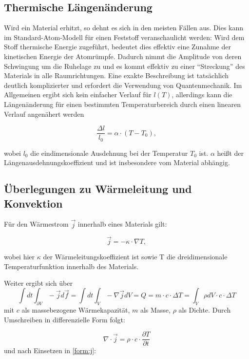 \subsection{Thermische Längenänderung}
Wird ein Material erhitzt, so dehnt es sich in den meisten Fällen aus. Dies kann im Standard-Atom-Modell für einen Feststoff veranschaulicht werden: Wird dem Stoff thermische Energie zugeführt, bedeutet dies effektiv eine Zunahme der kinetischen Energie der Atomrümpfe. Dadurch nimmt die Amplitude von deren Schwingung um die Ruhelage zu und es kommt effektiv zu einer \enquote{Streckung} des Materials in alle Raumrichtungen. Eine exakte Beschreibung ist tatsächlich deutlich komplizierter und erfordert die Verwendung von Quantenmechanik. Im Allgemeinen ergibt sich kein einfacher Verlauf für $ l(T) $, allerdings kann die Längenänderung für einen bestimmten Temperaturbereich durch einen linearen Verlauf angenähert werden 

\begin{equation}
\frac{ \Delta l}{l_{0}} = \alpha \cdot (T-T_{0}), 
\label{formel:ausdehnung}
\end{equation}

wobei $ l_{0} $ die eindimensionale Ausdehnung bei der Temperatur $ T_{0} $ ist. $ \alpha $ heißt der Längenausdehnungskoeffizient und ist insbesondere vom Material abhängig. 

\subsection{Überlegungen zu Wärmeleitung und Konvektion}
Für den Wärmestrom $ \vec{j} $ innerhalb eines Materials gilt: 

\begin{equation}
\vec{j} = - \kappa \cdot \nabla T, 
\label{form:j}
\end{equation}

wobei hier $ \kappa $ der Wärmeleitungskoeffizient ist sowie T die dreidimensionale Temperaturfunktion innerhalb des Materials. 

Weiter ergibt sich über
\begin{equation}
\int dt \int_{\partial V} -\vec{j} d \vec{f} = \int dt \int_{V} -\nabla \vec{j} dV = Q = m \cdot c \cdot \Delta T = \int_{V} \rho dV \cdot c \cdot \Delta T
\end{equation}
mit $c$ als massebezogene Wärmekapazität, $m$ als Masse, $\rho$ als Dichte. Durch Umschreiben in differenzielle Form folgt: 

\begin{equation}
\nabla \cdot \vec{j} = \rho \cdot c \cdot  \frac{\partial T}{\partial t}
\end{equation} 
und nach Einsetzen in \ref{form:j}: 

